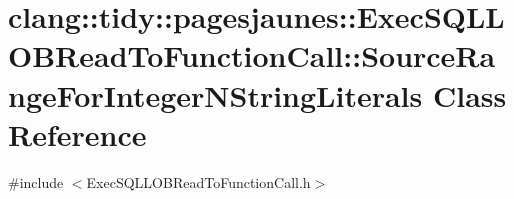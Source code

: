 \hypertarget{classclang_1_1tidy_1_1pagesjaunes_1_1_exec_s_q_l_l_o_b_read_to_function_call_1_1_source_range_for_integer_n_string_literals}{}\section{clang\+:\+:tidy\+:\+:pagesjaunes\+:\+:Exec\+S\+Q\+L\+L\+O\+B\+Read\+To\+Function\+Call\+:\+:Source\+Range\+For\+Integer\+N\+String\+Literals Class Reference}
\label{classclang_1_1tidy_1_1pagesjaunes_1_1_exec_s_q_l_l_o_b_read_to_function_call_1_1_source_range_for_integer_n_string_literals}


{\ttfamily \#include $<$Exec\+S\+Q\+L\+L\+O\+B\+Read\+To\+Function\+Call.\+h$>$}

